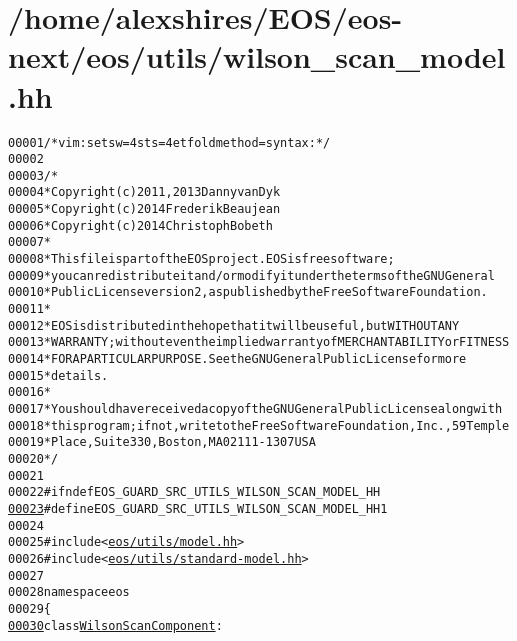 \hypertarget{wilson__scan__model_8hh_source}{
\section{/home/alexshires/EOS/eos-\/next/eos/utils/wilson\_\-scan\_\-model.hh}
}


\begin{footnotesize}\begin{alltt}
00001 \textcolor{comment}{/* vim: set sw=4 sts=4 et foldmethod=syntax : */}
00002 
00003 \textcolor{comment}{/*}
00004 \textcolor{comment}{ * Copyright (c) 2011, 2013 Danny van Dyk}
00005 \textcolor{comment}{ * Copyright (c) 2014 Frederik Beaujean}
00006 \textcolor{comment}{ * Copyright (c) 2014 Christoph Bobeth}
00007 \textcolor{comment}{ *}
00008 \textcolor{comment}{ * This file is part of the EOS project. EOS is free software;}
00009 \textcolor{comment}{ * you can redistribute it and/or modify it under the terms of the GNU General}
00010 \textcolor{comment}{ * Public License version 2, as published by the Free Software Foundation.}
00011 \textcolor{comment}{ *}
00012 \textcolor{comment}{ * EOS is distributed in the hope that it will be useful, but WITHOUT ANY}
00013 \textcolor{comment}{ * WARRANTY; without even the implied warranty of MERCHANTABILITY or FITNESS}
00014 \textcolor{comment}{ * FOR A PARTICULAR PURPOSE.  See the GNU General Public License for more}
00015 \textcolor{comment}{ * details.}
00016 \textcolor{comment}{ *}
00017 \textcolor{comment}{ * You should have received a copy of the GNU General Public License along with}
00018 \textcolor{comment}{ * this program; if not, write to the Free Software Foundation, Inc., 59 Temple}
00019 \textcolor{comment}{ * Place, Suite 330, Boston, MA  02111-1307  USA}
00020 \textcolor{comment}{ */}
00021 
00022 \textcolor{preprocessor}{#ifndef EOS\_GUARD\_SRC\_UTILS\_WILSON\_SCAN\_MODEL\_HH}
\hypertarget{wilson__scan__model_8hh_source_l00023}{}\hyperlink{wilson__scan__model_8hh_a30123afd38fa0d1cd5e4f0cf32e36bcd}{00023} \textcolor{preprocessor}{}\textcolor{preprocessor}{#define EOS\_GUARD\_SRC\_UTILS\_WILSON\_SCAN\_MODEL\_HH 1}
00024 \textcolor{preprocessor}{}
00025 \textcolor{preprocessor}{#include <\hyperlink{model_8hh}{eos/utils/model.hh}>}
00026 \textcolor{preprocessor}{#include <\hyperlink{standard-model_8hh}{eos/utils/standard-model.hh}>}
00027 
00028 \textcolor{keyword}{namespace }eos
00029 \{
\hypertarget{wilson__scan__model_8hh_source_l00030}{}\hyperlink{classeos_1_1WilsonScanComponent}{00030}     \textcolor{keyword}{class }\hyperlink{classeos_1_1WilsonScanComponent}{WilsonScanComponent} :

\end{alltt}
\end{footnotesize}
